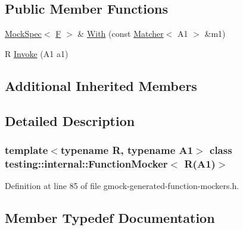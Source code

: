 \subsection*{Public Member Functions}
\begin{DoxyCompactItemize}
\item 
\hyperlink{classtesting_1_1internal_1_1MockSpec}{Mock\+Spec}$<$ \hyperlink{classtesting_1_1internal_1_1FunctionMocker_3_01R_07A1_08_4_ada54286442ab14a18c2308cef748848f}{F} $>$ \& \hyperlink{classtesting_1_1internal_1_1FunctionMocker_3_01R_07A1_08_4_aa61b5c24c52b8c49713774c49a01b26e}{With} (const \hyperlink{classtesting_1_1Matcher}{Matcher}$<$ A1 $>$ \&m1)
\item 
R \hyperlink{classtesting_1_1internal_1_1FunctionMocker_3_01R_07A1_08_4_a4a58d37902572c8136d999c5008dce1a}{Invoke} (A1 a1)
\end{DoxyCompactItemize}
\subsection*{Additional Inherited Members}


\subsection{Detailed Description}
\subsubsection*{template$<$typename R, typename A1$>$\newline
class testing\+::internal\+::\+Function\+Mocker$<$ R(\+A1)$>$}



Definition at line 85 of file gmock-\/generated-\/function-\/mockers.\+h.



\subsection{Member Typedef Documentation}
\mbox{\label{classtesting_1_1internal_1_1FunctionMocker_3_01R_07A1_08_4_aacec6412ac4343c071d7dfe965558b0b}} 
